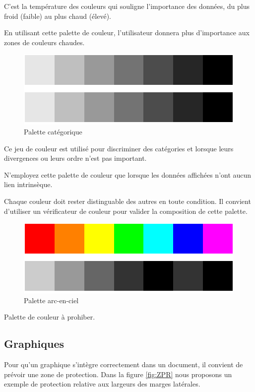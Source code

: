 \documentclass[a4paper,12pt]{article}
\begin{document}
\begin{multicols}{2}
C'est la température des couleurs qui souligne l'importance des données, du plus froid (faible) au plus chaud (élevé). \autocite{REF???}

En utilisant cette palette de couleur, l'utilisateur donnera plus d'importance aux zones de couleurs chaudes. \autocite{REF???}

\begin{figure}[H]
\centering
\includegraphics[width=.9\linewidth]{./img/palette-categorique.pdf}
\caption{\label{fig:Pal-c}Palette catégorique}
\end{figure}

Ce jeu de couleur est utilisé pour discriminer des catégories et lorsque leurs divergences ou leurs ordre n'est pas important.\autocite{andreaskrauseBestPracticesData2024}

N'employez cette palette de couleur que lorsque les données affichées n'ont aucun lien intrinsèque. \autocite{wilkeColorScales2019}

Chaque couleur doit rester distinguable des autres en toute condition.\autocite{wilkeRedundantCoding2019} Il convient d'utiliser un vérificateur de couleur pour valider la composition de cette palette.\autocite{andreaskrauseBestPracticesData2024}

\begin{figure}[H]
\centering
\includegraphics[width=.9\linewidth]{./img/palette-arc-en-ciel.pdf}
\caption{\label{fig:Pal-x}Palette arc-en-ciel}
\end{figure}

Palette de couleur à prohiber.\autocite{wilkeCommonPitfallsColor2019}
\subsection*{Graphiques}
\label{sec:org8b3caa4}
Pour qu'un graphique s'intègre correctement dans un document, il convient de prévoir une zone de protection. Dans la figure \ref{fig:ZPR} nous proposons un exemple de protection relative aux largeurs des marges latérales.


\end{multicols}
\end{document}
